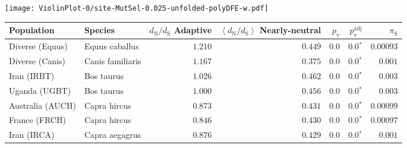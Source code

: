 \begin{center}
\begin{adjustbox}{width = 1\textwidth}
\begin{tabular}{|l|l|r|r|r|r|r|r|r|}
\bottomrule
\end{tabular}
\end{adjustbox}
\newpage
\texttt{[image: ViolinPlot-0/site-MutSel-0.025-unfolded-polyDFE-w.pdf]} 
\begin{adjustbox}{width = 1\textwidth}
\begin{tabular}{|l|l|r|r|r|r|r|}
\toprule
                     Population &              Species & \specialcell{$d_{\mathrm{N}} / d_{\mathrm{S}}$ \\ Adaptive} & \specialcell{$\left< d_{\mathrm{N}} / d_{\mathrm{S}} \right>$ \\ Nearly-neutral} & $p_{\mathrm{v}}$ & $p_{\mathrm{v}}^{\mathrm{adj}}$ & $\pi_{\textrm{S}}$ \\
\midrule
                Diverse (Equus) &       Equus caballus &                                           $ 1.210$ &                                           $ 0.449$ &            $0.0$ &                  $\bm{0.0{^*}}$ &          $0.00093$ \\
                Diverse (Canis) &     Canis familiaris &                                           $ 1.167$ &                                           $ 0.375$ &            $0.0$ &                  $\bm{0.0{^*}}$ &           $ 0.001$ \\
                    Iran (IRBT) &           Bos taurus &                                           $ 1.026$ &                                           $ 0.462$ &            $0.0$ &                  $\bm{0.0{^*}}$ &           $ 0.003$ \\
                  Uganda (UGBT) &           Bos taurus &                                           $ 1.000$ &                                           $ 0.456$ &            $0.0$ &                  $\bm{0.0{^*}}$ &           $ 0.003$ \\
               Australia (AUCH) &         Capra hircus &                                           $ 0.873$ &                                           $ 0.431$ &            $0.0$ &                  $\bm{0.0{^*}}$ &          $0.00099$ \\
                  France (FRCH) &         Capra hircus &                                           $ 0.846$ &                                           $ 0.430$ &            $0.0$ &                  $\bm{0.0{^*}}$ &          $0.00097$ \\
                    Iran (IRCA) &       Capra aegagrus &                                           $ 0.876$ &                                           $ 0.429$ &            $0.0$ &                  $\bm{0.0{^*}}$ &           $ 0.001$ \\

\end{tabular}
\end{adjustbox}
\end{center}
